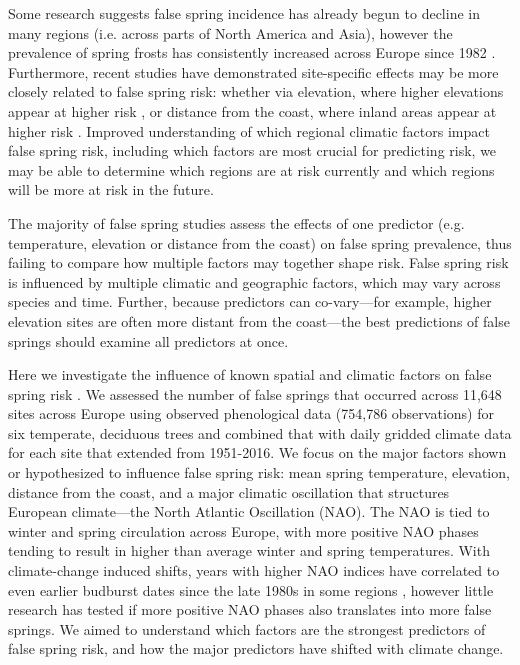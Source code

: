 \documentclass{article}\usepackage[]{graphicx}\usepackage[]{color}
\begin{document}
Some research suggests false spring incidence has already begun to decline in many regions (i.e. across parts of North America and Asia), however the prevalence of spring frosts has consistently increased across Europe since 1982 \citep{Liu2018}. Furthermore, recent studies have demonstrated site-specific effects may be more closely related to false spring risk: whether via elevation, where higher elevations appear at higher risk \citep{Ma2018, Vitasse2018, Vitra2017}, or distance from the coast, where inland areas appear at higher risk \citep{ Ma2018, Wypych2016a}. Improved understanding of which regional climatic factors impact false spring risk, including which factors are most crucial for predicting risk, we may be able to determine which regions are at risk currently and which regions will be more at risk in the future.

The majority of false spring studies assess the effects of one predictor (e.g. temperature, elevation or distance from the coast) on false spring prevalence, thus failing to compare how multiple factors may together shape risk. False spring risk is influenced by multiple climatic and geographic factors, which may vary across species and time. Further, because predictors can co-vary---for example, higher elevation sites are often more distant from the coast---the best predictions of false springs should examine all predictors at once. 

Here we investigate the influence of known spatial and climatic factors on false spring risk \citep[defined here as when fell temperatures below -2.2$^{\circ}$ between estimated budburst and leafout][]{Schwartz1993}. We assessed the number of false springs that occurred across 11,648 sites across Europe using observed phenological data (754,786 observations) for six temperate, deciduous trees and combined that with daily gridded climate data for each site that extended from 1951-2016. We focus on the major factors shown or hypothesized to influence false spring risk: mean spring temperature, elevation, distance from the coast, and a major climatic oscillation that structures European climate---the North Atlantic Oscillation (NAO). The NAO  is tied to winter and spring circulation across Europe, with more positive NAO phases tending to result in higher than average winter and spring temperatures. With climate-change induced shifts, years with higher NAO indices have correlated to even earlier budburst dates since the late 1980s in some regions \citep{Chmielewski2001}, however little research has tested if more positive NAO phases also translates into more false springs. We aimed to understand which factors are the strongest predictors of false spring risk, and how the major predictors have shifted with climate change. 
\end{document}
